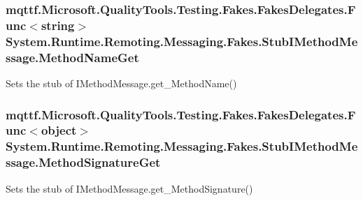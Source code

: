 \hypertarget{class_system_1_1_runtime_1_1_remoting_1_1_messaging_1_1_fakes_1_1_stub_i_method_message_a4e92e372abd948f743a1d8872d903440}{
\subsubsection[{Method\-Name\-Get}]{\setlength{\rightskip}{0pt plus 5cm}mqttf.\-Microsoft.\-Quality\-Tools.\-Testing.\-Fakes.\-Fakes\-Delegates.\-Func$<$string$>$ System.\-Runtime.\-Remoting.\-Messaging.\-Fakes.\-Stub\-I\-Method\-Message.\-Method\-Name\-Get}}\label{class_system_1_1_runtime_1_1_remoting_1_1_messaging_1_1_fakes_1_1_stub_i_method_message_a4e92e372abd948f743a1d8872d903440}


Sets the stub of I\-Method\-Message.\-get\-\_\-\-Method\-Name()

\hypertarget{class_system_1_1_runtime_1_1_remoting_1_1_messaging_1_1_fakes_1_1_stub_i_method_message_aee883b79b824a180389853e17671622e}{
\subsubsection[{Method\-Signature\-Get}]{\setlength{\rightskip}{0pt plus 5cm}mqttf.\-Microsoft.\-Quality\-Tools.\-Testing.\-Fakes.\-Fakes\-Delegates.\-Func$<$object$>$ System.\-Runtime.\-Remoting.\-Messaging.\-Fakes.\-Stub\-I\-Method\-Message.\-Method\-Signature\-Get}}\label{class_system_1_1_runtime_1_1_remoting_1_1_messaging_1_1_fakes_1_1_stub_i_method_message_aee883b79b824a180389853e17671622e}


Sets the stub of I\-Method\-Message.\-get\-\_\-\-Method\-Signature()

